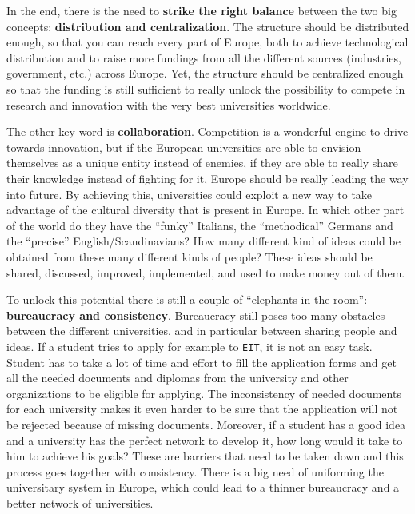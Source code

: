 \documentclass[11pt,a4paper,oneside,twocolumn]{IEEEtran}
\begin{document}
In the end, there is the need to \textbf{strike the right balance} between the two big concepts: \textbf{distribution and centralization}. The structure should be distributed enough, so that you can reach every part of Europe, both to achieve technological distribution and to raise more fundings from all the different sources (industries, government, etc.) across Europe. Yet, the structure should be centralized enough so that the funding is still sufficient to really unlock the possibility to compete in research and innovation with the very best universities worldwide.

The other key word is \textbf{collaboration}. Competition is a wonderful engine to drive towards innovation, but if the European universities are able to envision themselves as a unique entity instead of enemies, if they are able to really share their knowledge instead of fighting for it, Europe should be really leading the way into future. By achieving this, universities could exploit a new way to take advantage of the cultural diversity that is present in Europe. In which other part of the world do they have the ``funky'' Italians, the ``methodical'' Germans and the ``precise'' English/Scandinavians? How many different kind of ideas could be obtained from these many different kinds of people? These ideas should be shared, discussed, improved, implemented, and used to make money out of them.

To unlock this potential there is still a couple of ``elephants in the room'': \textbf{bureaucracy and consistency}. Bureaucracy still poses too many obstacles between the different universities, and in particular between sharing people and ideas. If a student tries to apply for example to \texttt{EIT}, it is not an easy task. Student has to take a lot of time and effort to fill the application forms and get all the needed documents and diplomas from the university and other organizations to be eligible for applying. The inconsistency of needed documents for each university makes it even harder to be sure that the application will not be rejected because of missing documents. Moreover, if a student has a good idea and a university has the perfect network to develop it, how long would it take to him to achieve his goals? These are barriers that need to be taken down and this process goes together with consistency. There is a big need of uniforming the universitary system in Europe, which could lead to a thinner bureaucracy and a better network of universities.
\end{document}
